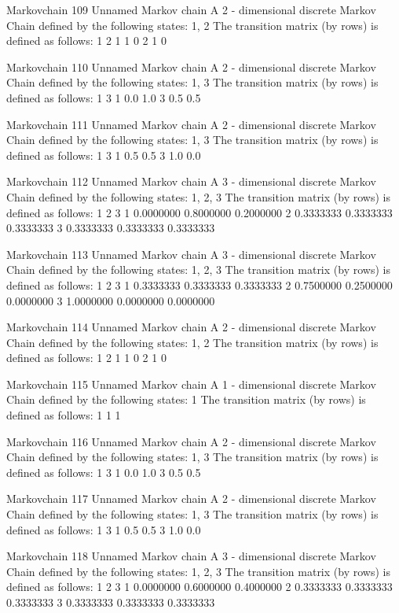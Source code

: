 \documentclass[
  nojss]{jss}
\begin{document}
\begin{CodeChunk}
\begin{CodeOutput}
Markovchain  109 
Unnamed Markov chain 
 A  2 - dimensional discrete Markov Chain defined by the following states: 
 1, 2 
 The transition matrix  (by rows)  is defined as follows: 
  1 2
1 1 0
2 1 0

Markovchain  110 
Unnamed Markov chain 
 A  2 - dimensional discrete Markov Chain defined by the following states: 
 1, 3 
 The transition matrix  (by rows)  is defined as follows: 
    1   3
1 0.0 1.0
3 0.5 0.5

Markovchain  111 
Unnamed Markov chain 
 A  2 - dimensional discrete Markov Chain defined by the following states: 
 1, 3 
 The transition matrix  (by rows)  is defined as follows: 
    1   3
1 0.5 0.5
3 1.0 0.0

Markovchain  112 
Unnamed Markov chain 
 A  3 - dimensional discrete Markov Chain defined by the following states: 
 1, 2, 3 
 The transition matrix  (by rows)  is defined as follows: 
          1         2         3
1 0.0000000 0.8000000 0.2000000
2 0.3333333 0.3333333 0.3333333
3 0.3333333 0.3333333 0.3333333

Markovchain  113 
Unnamed Markov chain 
 A  3 - dimensional discrete Markov Chain defined by the following states: 
 1, 2, 3 
 The transition matrix  (by rows)  is defined as follows: 
          1         2         3
1 0.3333333 0.3333333 0.3333333
2 0.7500000 0.2500000 0.0000000
3 1.0000000 0.0000000 0.0000000

Markovchain  114 
Unnamed Markov chain 
 A  2 - dimensional discrete Markov Chain defined by the following states: 
 1, 2 
 The transition matrix  (by rows)  is defined as follows: 
  1 2
1 1 0
2 1 0

Markovchain  115 
Unnamed Markov chain 
 A  1 - dimensional discrete Markov Chain defined by the following states: 
 1 
 The transition matrix  (by rows)  is defined as follows: 
  1
1 1

Markovchain  116 
Unnamed Markov chain 
 A  2 - dimensional discrete Markov Chain defined by the following states: 
 1, 3 
 The transition matrix  (by rows)  is defined as follows: 
    1   3
1 0.0 1.0
3 0.5 0.5

Markovchain  117 
Unnamed Markov chain 
 A  2 - dimensional discrete Markov Chain defined by the following states: 
 1, 3 
 The transition matrix  (by rows)  is defined as follows: 
    1   3
1 0.5 0.5
3 1.0 0.0

Markovchain  118 
Unnamed Markov chain 
 A  3 - dimensional discrete Markov Chain defined by the following states: 
 1, 2, 3 
 The transition matrix  (by rows)  is defined as follows: 
          1         2         3
1 0.0000000 0.6000000 0.4000000
2 0.3333333 0.3333333 0.3333333
3 0.3333333 0.3333333 0.3333333


\end{CodeOutput}
\end{CodeChunk}
\end{document}
